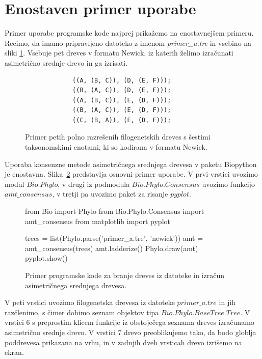 \documentclass[a4paper, 12pt]{book}
\begin{document}
\section{Enostaven primer uporabe}
Primer uporabe programske kode najprej prikažemo na
enostavnejšem primeru. Recimo, da imamo pripravljeno datoteko z imenom 
{\it primer\_a.tre} in vsebino na sliki \ref{trees-input}. Vsebuje pet dreves
v formatu Newick, iz katerih želimo izračunati asimetrično srednje drevo
in ga izrisati.

\begin{figure}[h!]
\begin{lstlisting}
             ((A, (B, C)), (D, (E, F)));
             ((B, (A, C)), (D, (E, F)));
             ((A, (B, C)), (E, (D, F)));
             ((B, (A, C)), (E, (D, F)));
             ((C, (B, A)), (E, (D, F)));
\end{lstlisting}
\caption{
	Primer petih polno razrešenih filogenetskih dreves s šestimi taksonomskimi 
	enotami, ki so kodirana v formatu Newick.
}
\label{trees-input}
\end{figure}

Uporaba konsenzne metode asimetričnega srednjega drevesa v paketu Biopython je 
enostavna. Slika~\ref{amt-example} predstavlja osnovni primer uporabe. V prvi 
vrstici uvozimo modul $Bio.Phylo$, v drugi iz podmodula $Bio.Phylo.Consensus$ 
uvozimo funkcijo $amt\_consensus$,  v tretji pa uvozimo paket za risanje $pyplot$.

\begin{figure}[h!]
	\begin{python}
		from Bio import Phylo
		from Bio.Phylo.Consensus import amt_consensus
		from matplotlib import pyplot
	
		trees = list(Phylo.parse('primer_a.tre', 'newick'))
		amt = amt_consensus(trees)
		amt.ladderize()
		Phylo.draw(amt)
		pyplot.show()
	\end{python}
	\caption{
		Primer programske kode za branje dreves iz datoteke in izračun 
		asimetričnega srednjega drevesa.
	}
	\label{amt-example}
\end{figure}


V peti vrstici uvozimo filogenetska drevesa iz datoteke $primer\_a.tre$ in jih 
razčlenimo, s čimer dobimo seznam objektov tipa $Bio.Phylo.BaseTree.Tree$. V 
vrstici 6 s preprostim klicem funkcije iz obstoječega seznama dreves 
iz\-ra\-ču\-na\-mo asimetrično srednje drevo. V vrstici 7 drevo preoblikujemo tako, 
da bodo globlja poddrevesa prikazana na vrhu, in v zadnjih dveh vrsticah drevo 
izrišemo na ekran. 
\end{document}

